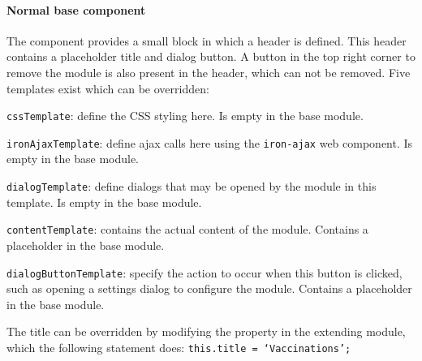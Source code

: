             \paragraph{Normal base component} The component provides a small block in which a header is defined. This header contains a placeholder title and dialog button. A button in the top right corner to remove the module is also present in the header, which can not be removed. Five templates exist which can be overridden: 
            \vspace{-6pt}
            \begin{myenumerate}
                \item \texttt{cssTemplate}: define the CSS styling here. Is empty in the base module.
                \item \texttt{ironAjaxTemplate}: define ajax calls here using the \texttt{iron-ajax} web component. Is empty in the base module.
                \item \texttt{dialogTemplate}: define dialogs that may be opened by the module in this template. Is empty in the base module.
                \item \texttt{contentTemplate}: contains the actual content of the module. Contains a placeholder in the base module.
                \item \texttt{dialogButtonTemplate}: specify the action to occur when this button is clicked, such as opening a settings dialog to configure the module. Contains a placeholder in the base module.
            \end{myenumerate}

            \noindent The title can be overridden by modifying the property in the extending module, which the following statement does: \texttt{this.title = `Vaccinations';}\medskip

